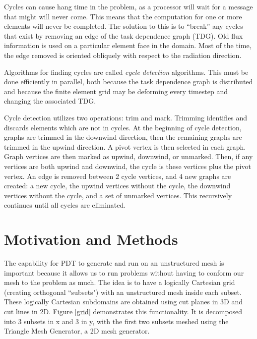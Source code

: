 \documentclass{anstrans}
\begin{document}
Cycles can cause hang time in the problem, as a processor will wait for a message that might will never come. This means that the computation for one or more elements will never be completed. The solution to this is to ``break'' any cycles that exist by removing an edge of the task dependence graph (TDG). Old flux information is used on a particular element face in the domain. Most of the time, the edge removed is oriented obliquely with respect to the radiation direction. 

Algorithms for finding cycles are called \textit{cycle detection} algorithms. This must be done efficiently in parallel, both because the task dependence graph is distributed and because the finite element grid may be deforming every timestep and changing the associated TDG.

Cycle detection utilizes two operations: trim and mark. Trimming identifies and discards elements which are not in cycles. At the beginning of cycle detection, graphs are trimmed in the downwind direction, then the remaining graphs are trimmed in the upwind direction. A pivot vertex is then selected in each graph. Graph vertices are then marked as upwind, downwind, or unmarked. Then, if any vertices are both upwind and downwind, the cycle is these vertices plus the pivot vertex. An edge is removed between 2 cycle vertices, and 4 new graphs are created: a new cycle, the upwind vertices without the cycle, the downwind vertices without the cycle, and a set of unmarked vertices. This recursively continues until all cycles are eliminated.


\section{Motivation and Methods}
The capability for PDT to generate and run on an unstructured mesh is important because it allows us to run problems without having to conform our mesh to the problem as much. The idea is to have a logically Cartesian grid (creating orthogonal ``subsets") with an unstructured mesh inside each subset. These logically Cartesian subdomains are obtained using cut planes in 3D and cut lines in 2D. Figure \ref{grid} demonstrates this functionality. It is decomposed into 3 subsets in x and 3 in y, with the first two subsets meshed using the Triangle Mesh Generator\cite{triangle}, a 2D mesh generator.
\end{document}
